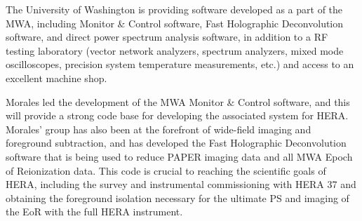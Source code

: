 \documentclass[11pt]{article}
\begin{document}
The University of Washington is providing software developed as a part of the MWA, including Monitor \& Control software, Fast Holographic Deconvolution software, and direct power spectrum analysis software, in addition to a RF testing laboratory (vector network analyzers, spectrum analyzers, mixed mode oscilloscopes, precision system temperature measurements, etc.) and access to an excellent machine shop.

Morales led the development of the MWA Monitor \& Control software, and this will provide a strong code base for developing the associated system for HERA. Morales' group has also been at the forefront of wide-field imaging and foreground subtraction, and has developed the Fast Holographic Deconvolution software that is being used to reduce PAPER imaging data and all MWA Epoch of Reionization data. This code is crucial to reaching the scientific goals of HERA, including the survey and instrumental commissioning with HERA 37 and obtaining the foreground isolation necessary for the ultimate PS and imaging of the EoR with the full HERA instrument.
\end{document}

